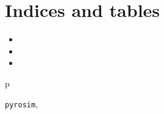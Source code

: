 \documentclass[letterpaper,10pt,english]{sphinxmanual}
\begin{document}
\chapter{Indices and tables}
\label{index:indices-and-tables}\begin{itemize}
\item {} 

\item {} 

\item {} 

\end{itemize}


\renewcommand{\indexname}{Python Module Index}
\begin{theindex}
\def\bigletter#1{{\Large\sffamily#1}\nopagebreak\vspace{1mm}}
\bigletter{p}
\item {\texttt{pyrosim}}, \pageref{code:module-pyrosim}
\end{theindex}

\renewcommand{\indexname}{Index}
\printindex
\end{document}
